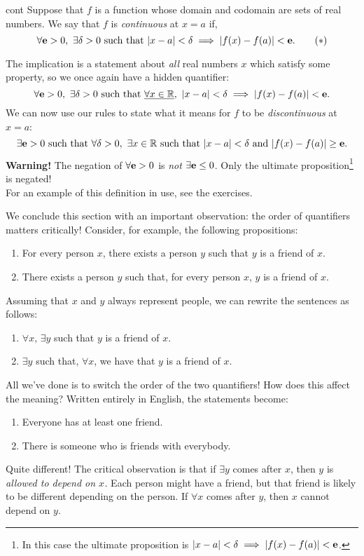 \begin{defn}{}{cont}
Suppose that $f$ is a function whose domain and codomain are sets of real numbers. We say that $f$ is \emph{continuous} at $x=a$ if,
\[\forall\ve >0,\ \exists\delta>0\text{ such that }|x-a|<\delta\implies |f(x)-f(a)|<\ve.\tag*{($\ast$)}\]
\end{defn}

 The implication is a statement about \emph{all} real numbers $x$ which satisfy some property, so we once again have a hidden quantifier:
\[\forall{\mathbf{e}}>0,\ \exists\delta>0\text{ such that }\underline{\forall x\in\mathbb{R}},\ |x-a|<\delta\implies |f(x)-f(a)|<{\mathbf{e}}.\]
We can now use our rules to state what it means for $f$ to be \emph{discontinuous} at $x=a$:
\[\exists{\mathbf{e}}>0\text{ such that }\forall\delta>0,\ \exists x\in\mathbb{R}\text{ such that }|x-a|<\delta\text{ and }|f(x)-f(a)|\ge{\mathbf{e}}.\]
{\bf Warning!} The negation of $\forall{\mathbf{e}}>0$ is \emph{not} $\exists{\mathbf{e}}\le 0$. Only the ultimate proposition\footnote{In this case the ultimate proposition is $|x-a|<\delta\implies |f(x)-f(a)|<{\mathbf{e}}$.} is negated!\\
For an example of this definition in use, see the exercises.


We conclude this section with an important observation: the order of quantifiers matters critically! Consider, for example, the following propositions: 
\begin{enumerate}
\item For every person $x$, there exists a person $y$ such that $y$ is a friend of $x$. 
\item There exists a person $y$ such that, for every person $x$, $y$ is a friend of $x$. 
\end{enumerate}
Assuming that $x$ and $y$ always represent people, we can rewrite the sentences as follows:
\begin{enumerate}
\item $\forall x,\,\exists y$ such that $y$ is a friend of $x$.
\item $\exists y$ such that, $\forall x$, we have that $y$ is a friend of $x$.
\end{enumerate}


 All we've done is to switch the order of the two quantifiers! How does this affect the meaning? Written entirely in English, the statements become:
\begin{enumerate}
\item Everyone has at least one friend.
\item There is someone who is friends with everybody.
\end{enumerate}
Quite different! The critical observation is that if $\exists y$ comes after $x$, then $y$ is \emph{allowed to depend on $x$.} Each person might have a friend, but that friend is likely to be different depending on the person. If $\forall x$ comes after $y$, then $x$ cannot depend on $y$.\\

